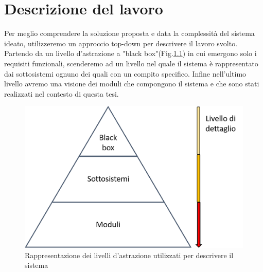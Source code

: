\chapter{Descrizione del lavoro}
\label{scenario}
Per meglio comprendere la soluzione proposta e data la complessità del sistema ideato, utilizzeremo un approccio top-down per descrivere il lavoro svolto. Partendo da un livello d'astrazione a "black box"(Fig.\ref{fig:livelliAstrazione}) in cui emergono solo i requisiti funzionali, scenderemo ad un livello nel quale il sistema è rappresentato dai sottosistemi ognuno dei quali con un compito specifico. Infine nell'ultimo livello avremo una visione dei moduli che compongono il sistema e che sono stati realizzati nel contesto di questa tesi.
\begin{figure}[H]
	\centering
	\includegraphics[scale=0.4]{DescrizioneDelSistema/livelli_astrazione.png}
	\caption{Rappresentazione dei livelli d'astrazione utilizzati per descrivere il sistema }
	\label{fig:livelliAstrazione}
\end{figure}
\newpage

